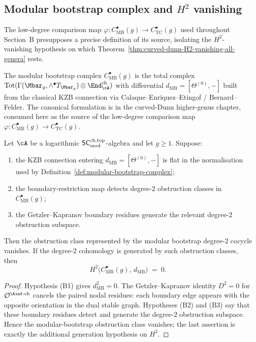 \subsection{Modular bootstrap complex and $H^2$ vanishing}
\label{subsec:modular-bootstrap-complex}

The low-degree comparison map
$\varphi \colon C^\bullet_{\mathrm{MB}}(g) \to
C^\bullet_{\mathrm{TC}}(g)$ used throughout
Section~B presupposes a precise definition of its source,
isolating the $H^2$-vanishing hypothesis on which
Theorem~\ref{thm:curved-dunn-H2-vanishing-all-genera} rests.

The modular bootstrap complex
$C^\bullet_{\mathrm{MB}}(g)$ is the total complex
$\mathrm{Tot}(\Gamma(\Mbar_g, \wedge^\bullet T_{\Mbar_g})
\otimes \End^{\mathrm{ch}}_{\cA})$ with differential
$d_{\mathrm{MB}} = [\Theta^{(0)}, -]$ built from the classical
KZB connection via Calaque--Enriquez--Etingof / Bernard--Felder.
The canonical formulation is 
in the curved-Dunn higher-genus chapter, consumed here as
the source of the low-degree comparison map
$\varphi \colon C^\bullet_{\mathrm{MB}}(g)
\to C^\bullet_{\mathrm{TC}}(g)$.

\begin{theorem}
\label{thm:mb-H2-vanishing}

Let $\cA$ be a logarithmic $\mathsf{SC}^{\mathrm{ch,top}}_{\mathrm{mod}}$-algebra and let $g\ge1$. Suppose:
\begin{enumerate}[label=\textup{(B\arabic*)}]
\item the KZB connection entering $d_{\mathrm{MB}}=[\Theta^{(0)},-]$
is flat in the normalisation used by
Definition~\ref{def:modular-bootstrap-complex};
\item the boundary-restriction map detects degree-$2$ obstruction
classes in $C^\bullet_{\mathrm{MB}}(g)$;
\item the Getzler--Kapranov boundary residues generate the relevant
degree-$2$ obstruction subspace.
\end{enumerate}
Then the obstruction class represented by the modular bootstrap
degree-$2$ cocycle vanishes. If the degree-$2$ cohomology is generated
by such obstruction classes, then
\[
 H^2\!\bigl(C^\bullet_{\mathrm{MB}}(g),\, d_{\mathrm{MB}}\bigr)
 \;=\; 0.
\]
\end{theorem}

\begin{proof}
Hypothesis \textup{(B1)} gives $d_{\mathrm{MB}}^2=0$. The
Getzler--Kapranov identity $D^2=0$ for
$\mathcal{O}^{\Ainf\text{-ch}}$ cancels the paired nodal residues:
each boundary edge appears with the opposite orientation in the dual
stable graph. Hypotheses \textup{(B2)} and \textup{(B3)} say that these
boundary residues detect and generate the degree-$2$ obstruction
subspace. Hence the modular-bootstrap obstruction class vanishes; the
last assertion is exactly the additional generation hypothesis on
$H^2$.
\end{proof}

